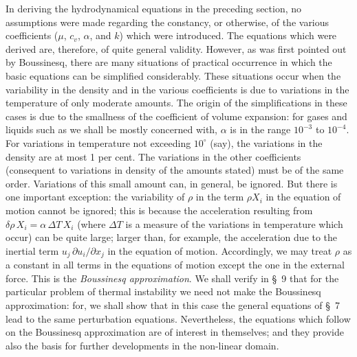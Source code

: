 In deriving the hydrodynamical equations in the preceding section,
no assumptions were made regarding the constancy, or otherwise, of the
various coefficients ($\mu$, $c_v$, $\alpha$, and $k$) which were introduced. The equations which were derived are, therefore, of quite general validity. However, as was first pointed out by Boussinesq, there are many situations
of practical occurrence in which the basic equations can be simplified
considerably. These situations occur when the variability in the
density and in the various coefficients is due to variations in the temperature of only moderate amounts. The origin of the simplifications in
these cases is due to the smallness of the coefficient of volume expansion:
for gases and liquids such as we shall be mostly concerned with, $\alpha$ is in
the range $10^{-3}$ to $10^{-4}$. For variations in temperature not exceeding $10^\circ$
(say), the variations in the density are at most 1 per cent. The variations
in the other coefficients (consequent to variations in density of the
amounts stated) must be of the same order. Variations of this small
amount can, in general, be ignored. But there is one important exception: the variability of $\rho$ in the term $\rho X_i$ in the equation of motion
cannot be ignored; this is because the acceleration resulting from $\delta\rho\,X_i = \alpha\,\Delta T\,X_i$
(where $\Delta T$ is a measure of the variations in temperature which occur)
can be quite large; larger than, for example, the acceleration due to the
inertial term $u_j\,\partial u_i/\partial x_j$ in the equation of motion. Accordingly, we may
treat $\rho$ as a constant in all terms in the equations of motion except the
one in the external force. This is the \emph{Boussinesq approximation}. We
shall verify in \S~9 that for the particular problem of thermal instability
we need not make the Boussinesq approximation: for, we shall show that
in this case the general equations of \S~7 lead to the same perturbation
equations. Nevertheless, the equations which follow on the Boussinesq
approximation are of interest in themselves; and they provide also the
basis for further developments in the non-linear domain.


